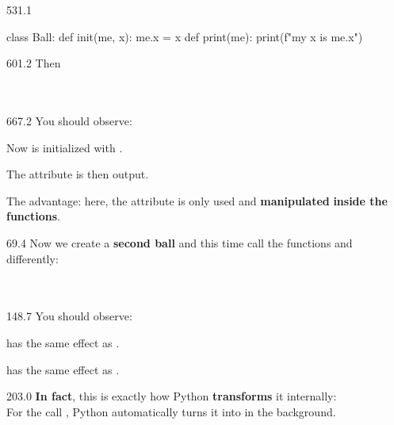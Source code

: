 \documentclass{aslab}
\newcommand*\inp[1]{\makebox[26.4bp][l]{\ttfamily(#1)}}
\newcommand*\codexi[1]{\fontsize{11bp}{#1bp}\ttfamily\lineskiplimit=-\maxdimen}
\begin{document}
\begin{region}[pitch=13.2]{531.1}
\begin{codeblock}[basicstyle=\codexi{13.2}]
class Ball:
    def init(me, x):
        me.x = x
    def print(me):
        print(f"my x is {me.x}")
\end{codeblock}
\end{region}

\begin{region}[pitch=13.3]{601.2}
Then\\
\inp{1}\\
\inp{2}\\
\inp{3}
\end{region}

\begin{region}[pitch=13.37]{667.2}
You should observe:
\begin{dashlist}
\item Now  is initialized with .
\item The attribute  is then output.
\item The advantage: here, the attribute  is only used and
  \textbf{manipulated} \textbf{inside the functions}.
\end{dashlist}
\end{region}

\nextpage
\begin{region}[pitch=13.3]{69.4}
Now we create a \textbf{second ball} and this time call the functions
 and  differently:\\
\inp{1}\\
\inp{2}\\
\inp{3}
\end{region}

\begin{region}[pitch=13.15]{148.7}
You should observe:
\begin{dashlist}
\item {} has the same effect as
  .
\item {} has the same effect as .
\end{dashlist}
\end{region}

\begin{region}[pitch=13.4]{203.0}
\textbf{In fact}, this is exactly how Python \textbf{transforms} it
internally:\\
For the call , Python automatically turns it into
 in the background.
\end{region}
\end{document}
